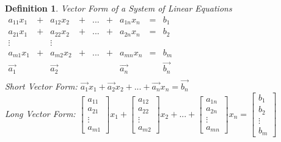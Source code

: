 \documentclass[a4paper,12pt,openany]{book}
\theoremstyle{defn}
\newtheorem{defn}{Definition}[section]
\theoremstyle{expl}
\begin{document}
\begin{defn}
\textup{
Vector Form of a System of Linear Equations\\
$\begin{array}{ccccccccc}
a_{11}x_1&+&a_{12}x_2&+&...&+&a_{1n}x_n &=&b_1\\
a_{21}x_1&+&a_{22}x_2&+&...&+&a_{2n}x_n &=&b_2\\
\vdots&&\vdots\\
a_{m1}x_1&+&a_{m2}x_2&+&...&+&a_{mn}x_n&=& b_m\\
\vec{a_1}&&\vec{a_2}&&&&\vec{a_n}&&\vec{b_n}\\
\end{array}$\\
Short Vector Form: $\vec{a_1}x_1+\vec{a_2}x_2+...+\vec{a_n}x_n=\vec{b_n}$\\
Long Vector Form: $\left[\begin{array}{c} a_{11}\\a_{21}\\\vdots\\a_{m1}\end{array}\right]x_1
+\left[\begin{array}{c} a_{12}\\a_{22}\\\vdots\\a_{m2}\end{array}\right]x_2+...
+\left[\begin{array}{c} a_{1n}\\a_{2n}\\\vdots\\a_{mn}\end{array}\right]x_n
=\left[\begin{array}{c} b_{1}\\b_{2}\\\vdots\\b_{m}\end{array}\right]$
}\end{defn}
\end{document}

